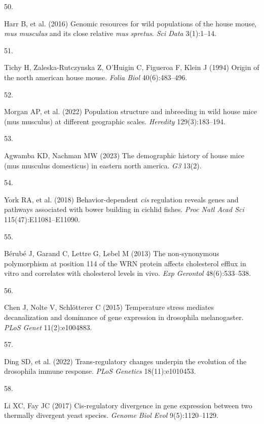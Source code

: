 \documentclass[9pt,twocolumn,twoside,lineno]{pnas-new}
\newlength{\cslhangindent}
\newlength{\csllabelwidth}
\newlength{\cslentryspacingunit} %
\newenvironment{CSLReferences}[2] %
 {%
  \setlength{\parindent}{0pt}
  \ifodd #1
  \let\oldpar\par
  \def\par{\hangindent=\cslhangindent\oldpar}
  \fi
  \setlength{\parskip}{#2\cslentryspacingunit}
 }%
 {}
\newcommand{\CSLLeftMargin}[1]{\parbox[t]{\csllabelwidth}{#1}}
\newcommand{\CSLRightInline}[1]{\parbox[t]{\linewidth - \csllabelwidth}{#1}\break}
\begin{document}
\begin{CSLReferences}{0}{0}
\leavevmode{}%
\CSLLeftMargin{50. }%
\CSLRightInline{Harr B, et al. (2016) Genomic resources for wild
populations of the house mouse, \emph{mus musculus} and its close
relative \emph{mus spretus}. \emph{Sci Data} 3(1):1--14.}

\leavevmode{}%
\CSLLeftMargin{51. }%
\CSLRightInline{Tichy H, Zaleska-Rutczynska Z, O'Huigin C, Figueroa F,
Klein J (1994) Origin of the north american house mouse. \emph{Folia
Biol} 40(6):483--496.}

\leavevmode{}%
\CSLLeftMargin{52. }%
\CSLRightInline{Morgan AP, et al. (2022) Population structure and
inbreeding in wild house mice (mus musculus) at different geographic
scales. \emph{Heredity} 129(3):183--194.}

\leavevmode{}%
\CSLLeftMargin{53. }%
\CSLRightInline{Agwamba KD, Nachman MW (2023) The demographic history of
house mice (mus musculus domesticus) in eastern north america. \emph{G3}
13(2).}

\leavevmode{}%
\CSLLeftMargin{54. }%
\CSLRightInline{York RA, et al. (2018) Behavior-dependent \emph{cis}
regulation reveals genes and pathways associated with bower building in
cichlid fishes. \emph{Proc Natl Acad Sci} 115(47):E11081--E11090.}

\leavevmode{}%
\CSLLeftMargin{55. }%
\CSLRightInline{Bérubé J, Garand C, Lettre G, Lebel M (2013) The
non-synonymous polymorphism at position 114 of the {WRN} protein affects
cholesterol efflux in vitro and correlates with cholesterol levels in
vivo. \emph{Exp Gerontol} 48(6):533--538.}

\leavevmode{}%
\CSLLeftMargin{56. }%
\CSLRightInline{Chen J, Nolte V, Schlötterer C (2015) Temperature stress
mediates decanalization and dominance of gene expression in drosophila
melanogaster. \emph{PLoS Genet} 11(2):e1004883.}

\leavevmode{}%
\CSLLeftMargin{57. }%
\CSLRightInline{Ding SD, et al. (2022) Trans-regulatory changes underpin
the evolution of the drosophila immune response. \emph{PLoS Genetics}
18(11):e1010453.}

\leavevmode{}%
\CSLLeftMargin{58. }%
\CSLRightInline{Li XC, Fay JC (2017) {Cis-regulatory} divergence in gene
expression between two thermally divergent yeast species. \emph{Genome
Biol Evol} 9(5):1120--1129.}


\end{CSLReferences}
\end{document}
